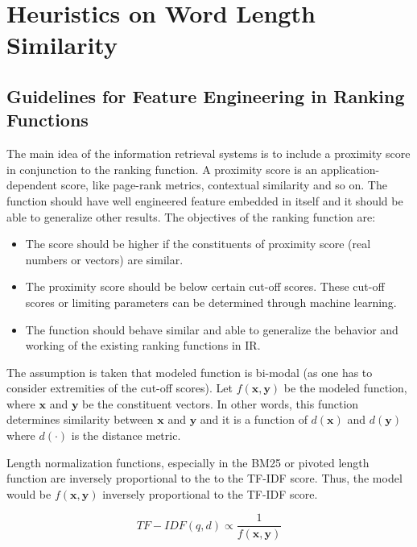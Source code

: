 
\chapter{Heuristics on Word Length Similarity} %

\label{ch:word} %

	\section{Guidelines for Feature Engineering in Ranking Functions}

The main idea of the information retrieval systems is to include a proximity score in conjunction to the ranking function. A proximity score is an application-dependent score, like page-rank metrics, contextual similarity and so on. The function should have well engineered feature embedded in itself and it should be able to generalize other results. The objectives of the ranking function are:

\begin{itemize}
	\item The score should be higher if the constituents of proximity score (real numbers or vectors) are similar.
	\item The proximity score should be below certain cut-off scores. These cut-off scores or limiting parameters can be determined through machine learning.
	\item The function should behave similar and able to generalize the behavior and working of the existing ranking functions in IR.
\end{itemize}

The assumption is taken that modeled function is bi-modal (as one has to consider extremities of the cut-off scores). Let $f(\mathbf{x}, \mathbf{y})$ be the modeled function, where $\mathbf{x}$ and $\mathbf{y}$ be the constituent vectors. In other words, this function determines similarity between $\mathbf{x}$ and $\mathbf{y}$ and it is a function of $d(\mathbf{x})$ and $d(\mathbf{y})$ where $d(\cdot)$ is the distance metric.


Length normalization functions, especially in the BM25 or pivoted length function are inversely proportional to the to the TF-IDF score. Thus, the model would be $f(\mathbf{x}, \mathbf{y})$ inversely proportional to the TF-IDF score.


\begin{equation*}
TF-IDF(q, d) \propto \frac{1}{f(\mathbf{x}, \mathbf{y})}
\end{equation*}


